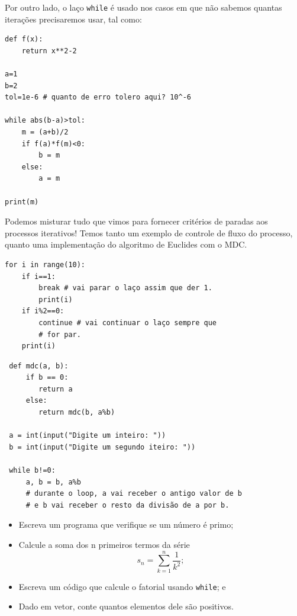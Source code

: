 \documentclass[../numerical_methods.tex]{subfiles}
\begin{document}
Por outro lado, o laço \texttt{while} é usado nos casos em que não sabemos quantas iterações precisaremos usar, tal como:
\begin{listing}[H]
	\caption{Método da bisseção simples}
	\begin{verbatim}
def f(x):
    return x**2-2

a=1
b=2
tol=1e-6 # quanto de erro tolero aqui? 10^-6

while abs(b-a)>tol: 
    m = (a+b)/2
    if f(a)*f(m)<0: 
        b = m 
    else: 
        a = m

print(m)
  \end{verbatim}
\end{listing}

Podemos misturar tudo que vimos para fornecer critérios de paradas aos processos iterativos! Temos tanto um exemplo de controle de fluxo do processo, quanto uma implementação do algoritmo de Euclides com o MDC.

\begin{listing}[H]
	\caption{Controle de fluxo}
	\begin{verbatim}
for i in range(10):
    if i==1:
        break # vai parar o laço assim que der 1.
        print(i)
    if i%2==0:
        continue # vai continuar o laço sempre que 
        # for par.
    print(i)
 \end{verbatim}

	\caption{Algoritmo de Euclides (MDC, recursivo)}
	\begin{verbatim}
 def mdc(a, b):
     if b == 0:
        return a 
     else: 
        return mdc(b, a%b)

 a = int(input("Digite um inteiro: "))
 b = int(input("Digite um segundo iteiro: "))

 while b!=0:
     a, b = b, a%b
     # durante o loop, a vai receber o antigo valor de b 
     # e b vai receber o resto da divisão de a por b.
 \end{verbatim}
\end{listing}

\begin{exr}
	\begin{itemize}
		\item[1)] Escreva um programa que verifique se um número é primo;
		\item[2)] Calcule a soma dos n primeiros termos da série
		      \[
			      s_{n} = \sum\limits_{k=1}^{n}\frac{1}{k^{2}};
		      \]
		\item[3)] Escreva um código que calcule o fatorial usando \texttt{while}; e
		\item[4)] Dado em vetor, conte quantos elementos dele são positivos.

	\end{itemize}
\end{exr}
\end{document}
